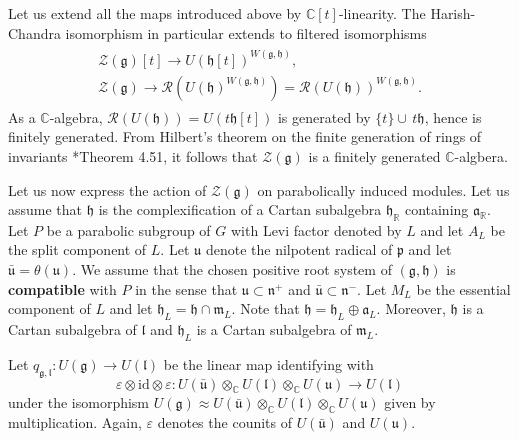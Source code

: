 \documentclass{amsart}
\theoremstyle{definition}
\begin{document}
Let us extend all the maps introduced above by $\mathbb{C}[t]$-linearity. The Harish-Chandra isomorphism in particular extends to filtered isomorphisms
\begin{gather}\label{extended_HC_iso}\begin{gathered}
    \mathcal{Z}(\mathfrak{g})[t] \to U(\mathfrak{h}[t])^{W(\mathfrak{g},\mathfrak{h})},\\
    \mathcal{Z}(\bm{\mathfrak{g}}) \to \mathcal{R}\left(U(\mathfrak{h})^{W(\mathfrak{g},\mathfrak{h})}\right) = \mathcal{R}(U(\mathfrak{h}))^{W(\mathfrak{g},\mathfrak{h})}.\end{gathered}
\end{gather}
As a $\mathbb{C}$-algebra, $\mathcal{R}(U(\mathfrak{h})) = U(t\mathfrak{h}[t])$ is generated by $\{t\}\cup \,t\mathfrak{h}$, hence is finitely generated. From Hilbert's theorem on the finite generation of rings of invariants \cite{Mukai}*{Theorem 4.51}, it follows that $\mathcal{Z}(\bm{\mathfrak{g}})$ is a finitely generated $\mathbb{C}$-algbera.

Let us now express the action of $\mathcal{Z}(\bm{\mathfrak{g}})$ on parabolically induced modules. Let us assume that $\mathfrak{h}$ is the complexification of a Cartan subalgebra $\mathfrak{h}_\mathbb{R}$ containing $\mathfrak{a}_\mathbb{R}$. Let $P$ be a parabolic subgroup of $G$ with Levi factor denoted by $L$ and let $A_L$ be the split component of $L$. Let $\mathfrak{u}$ denote the nilpotent radical of $\mathfrak{p}$ and let $\bar{\mathfrak{u}} = \theta(\mathfrak{u})$. We assume that the chosen positive root system of $(\mathfrak{g},\mathfrak{h})$ is \textbf{compatible} with $P$ in the sense that $\mathfrak{u} \subset \mathfrak{n}^+$ and $\bar{\mathfrak{u}} \subset \mathfrak{n}^-$. Let $M_L$ be the essential component of $L$ and let $\mathfrak{h}_L = \mathfrak{h} \cap \mathfrak{m}_L$. Note that $\mathfrak{h} = \mathfrak{h}_L \oplus \mathfrak{a}_L$. Moreover, $\mathfrak{h}$ is a Cartan subalgebra of $\mathfrak{l}$ and $\mathfrak{h}_L$ is a Cartan subalgebra of $\mathfrak{m}_L$.

Let $q_{\mathfrak{g},\mathfrak{l}} : U(\mathfrak{g}) \to U(\mathfrak{l})$ be the linear map identifying with \[\varepsilon \otimes \mathrm{id} \otimes \varepsilon : U(\bar{\mathfrak{u}}) \otimes_\mathbb{C} U(\mathfrak{l})\otimes_\mathbb{C} U(\mathfrak{u})\to U(\mathfrak{l})\] under the isomorphism $U(\mathfrak{g}) \approx U(\bar{\mathfrak{u}}) \otimes_\mathbb{C} U(\mathfrak{l})\otimes_\mathbb{C} U(\mathfrak{u})$ given by multiplication. Again, $\varepsilon$ denotes the counits of $U(\bar{\mathfrak{u}})$ and $U(\mathfrak{u})$.
\end{document}
